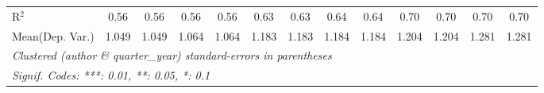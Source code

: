\begin{tabular}{lcccccccccccc}
   R$^2$                                    & 0.56          & 0.56     & 0.56          & 0.56     & 0.63         & 0.63     & 0.64          & 0.64     & 0.70    & 0.70     & 0.70    & 0.70\\  
Mean(Dep. Var.) & 1.049 & 1.049 & 1.064 & 1.064 & 1.183 & 1.183 & 1.184 & 1.184 & 1.204 & 1.204 & 1.281 & 1.281 \\
   \midrule \midrule
   \multicolumn{13}{l}{\emph{Clustered (author \& quarter\_year) standard-errors in parentheses}}\\
   \multicolumn{13}{l}{\emph{Signif. Codes: ***: 0.01, **: 0.05, *: 0.1}}\\
\end{tabular}
\par\endgroup

